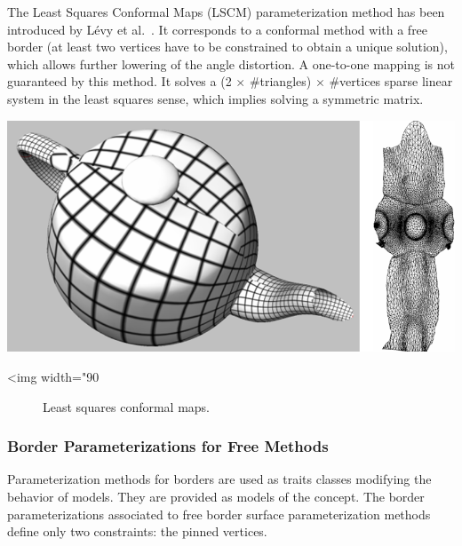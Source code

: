 The Least Squares Conformal Maps (LSCM) parameterization method has
been introduced by L\'evy et al.~\cite{cgal:lprm-lscm-02}. It corresponds to a conformal method with a free border (at least two
vertices have to be constrained to obtain a unique solution), which
allows further lowering of the angle distortion. A one-to-one mapping
is not guaranteed by this method. It solves a (2 $\times$
\#triangles) $\times$ \#vertices sparse linear system in the least squares sense,
which implies solving a symmetric matrix.

\begin{center}
    \label{Surface_mesh_parameterization-fig-LSCM}
    \begin{ccTexOnly}
        \includegraphics[width=1.0\textwidth]{Surface_mesh_parameterization/LSCM}
    \end{ccTexOnly}
    \begin{ccHtmlOnly}
        <img width="90%
    \end{ccHtmlOnly}
    \begin{figure}[h]
        \caption{Least squares conformal maps.}
    \end{figure}
\end{center}


\subsubsection{Border Parameterizations for Free Methods}
\label{sec:Border-Parameterizations-for-Free-Methods}

Parameterization methods for
borders are used as traits classes modifying the behavior of
 models. They are provided as models of the  concept.
The border parameterizations associated to free border surface
parameterization methods define only two constraints: the pinned vertices.

